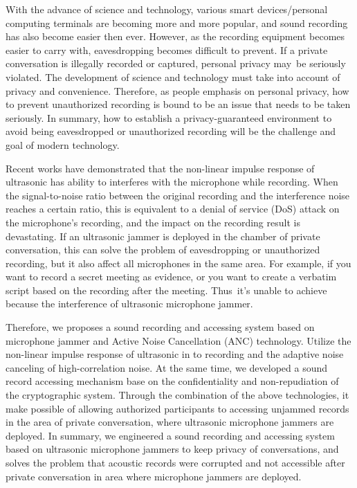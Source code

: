 \begin{abstract*}

    With the advance of science and technology,
various smart devices/personal computing terminals are becoming more and more popular,
and sound recording has also become easier then ever.
However, as the recording equipment becomes easier to carry with,
eavesdropping becomes difficult to prevent.
If a private conversation is illegally recorded or captured,
personal privacy may be seriously violated.
The development of science and technology must take into account of privacy and convenience.
Therefore, as people emphasis on personal privacy,
how to prevent unauthorized recording is bound to be an issue that needs to be taken seriously.
In summary, how to establish a privacy-guaranteed environment
to avoid being eavesdropped or unauthorized recording
will be the challenge and goal of modern technology.

    Recent works have demonstrated that the non-linear impulse response of ultrasonic
has ability to interferes with the microphone while recording.
When the signal-to-noise ratio between the original recording
and the interference noise reaches a certain ratio,
this is equivalent to a denial of service (DoS) attack on the microphone's recording,
and the impact on the recording result is devastating.
If an ultrasonic jammer is deployed in the chamber of private conversation,
this can solve the problem of eavesdropping or unauthorized recording,
but it also affect all microphones in the same area. For example,
if you want to record a secret meeting as evidence,
or you want to create a verbatim script based on the recording after the meeting.
Thus it's unable to achieve because the interference of ultrasonic microphone jammer.

    Therefore, we proposes a sound recording and accessing system
based on microphone jammer and Active Noise Cancellation (ANC) technology.
Utilize the non-linear impulse response of ultrasonic in to recording
and the adaptive noise canceling of high-correlation noise.
At the same time, we developed a sound record accessing mechanism
base on the confidentiality and non-repudiation of the cryptographic system.
Through the combination of the above technologies,
it make possible of allowing authorized participants to accessing unjammed records
in the area of private conversation, where ultrasonic microphone jammers are deployed.
In summary, we engineered a sound recording and accessing system
based on ultrasonic microphone jammers to keep privacy of conversations,
and solves the problem that acoustic records were corrupted and not accessible
after private conversation in area where microphone jammers are deployed.

\end{abstract*}